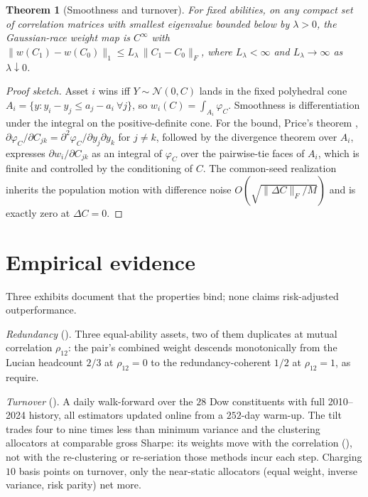 \documentclass[11pt]{article}
\newtheorem{theorem}{Theorem}
\begin{document}
\begin{theorem}[Smoothness and turnover]
\label{thm:smooth}
For fixed abilities, on any compact set of correlation matrices with smallest
eigenvalue bounded below by $\lambda > 0$, the Gaussian-race weight map is
$C^\infty$ with
$\|w(C_1) - w(C_0)\|_1 \le L_\lambda\,\|C_1 - C_0\|_F$, where
$L_\lambda < \infty$ and $L_\lambda \to \infty$ as $\lambda \downarrow 0$.
\end{theorem}
\begin{proof}[Proof sketch]
Asset $i$ wins iff $Y \sim \mathcal N(0,C)$ lands in the fixed polyhedral cone
$A_i = \{y : y_i - y_j \le a_j - a_i\ \forall j\}$, so
$w_i(C) = \int_{A_i} \varphi_C$. Smoothness is differentiation under the
integral on the positive-definite cone. For the bound, Price's theorem
\parencite{price1958}, $\partial\varphi_C/\partial C_{jk} =
\partial^2\varphi_C/\partial y_j\partial y_k$ for $j \ne k$, followed by the
divergence theorem over $A_i$, expresses $\partial w_i/\partial C_{jk}$ as an
integral of $\varphi_C$ over the pairwise-tie faces of $A_i$, which is finite
and controlled by the conditioning of $C$. The common-seed realization
inherits the population motion with difference noise
$O(\sqrt{\|\Delta C\|_F/M})$ and is exactly zero at $\Delta C = 0$.
\end{proof}

\section{Empirical evidence}
\label{sec:evidence}

Three exhibits document that the properties bind; none claims risk-adjusted
outperformance.

\emph{Redundancy} (). Three equal-ability assets, two of
them duplicates at mutual correlation $\rho_{12}$: the pair's combined weight
descends monotonically from the Lucian headcount $2/3$ at $\rho_{12} = 0$ to
the redundancy-coherent $1/2$ at $\rho_{12} = 1$, as
 require.

\emph{Turnover} (). A daily walk-forward over the $28$ Dow
constituents with full 2010--2024 history, all estimators updated online from
a $252$-day warm-up. The tilt trades four to nine times less than minimum
variance and the clustering allocators at comparable gross Sharpe: its weights
move with the correlation (), not with the re-clustering or
re-seriation those methods incur each step. Charging $10$ basis points on
turnover, only the near-static allocators (equal weight, inverse variance,
risk parity) net more.
\end{document}
